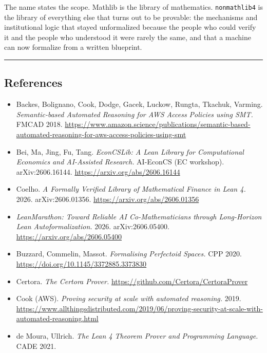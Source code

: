 \documentclass[
  11pt,
]{article}
\providecommand{\tightlist}{%
  \setlength{\itemsep}{0pt}\setlength{\parskip}{0pt}}
\renewcommand{\_}{\origunderscore\allowbreak}
\begin{document}
The name states the scope. Mathlib is the library of mathematics.
\texttt{nonmathlib4} is the library of everything else that turns out to
be provable: the mechanisms and institutional logic that stayed
unformalized because the people who could verify it and the people who
understood it were rarely the same, and that a machine can now formalize
from a written blueprint.

\begin{center}\rule{0.5\linewidth}{0.5pt}\end{center}

\subsection{References}\label{references}

\begin{itemize}
\tightlist
\item
  Backes, Bolignano, Cook, Dodge, Gacek, Luckow, Rungta, Tkachuk,
  Varming. \emph{Semantic-based Automated Reasoning for AWS Access
  Policies using SMT.} FMCAD 2018.
  \url{https://www.amazon.science/publications/semantic-based-automated-reasoning-for-aws-access-policies-using-smt}
\item
  Bei, Ma, Jing, Fu, Tang. \emph{EconCSLib: A Lean Library for
  Computational Economics and AI-Assisted Research.} AI-EconCS
   (EC workshop). arXiv:2606.16144.
  \url{https://arxiv.org/abs/2606.16144}
\item
  Coelho. \emph{A Formally Verified Library of Mathematical Finance in
  Lean 4.} 2026. arXiv:2606.01356.
  \url{https://arxiv.org/abs/2606.01356}
\item
  \emph{LeanMarathon: Toward Reliable AI Co-Mathematicians through
  Long-Horizon Lean Autoformalization.} 2026. arXiv:2606.05400.
  \url{https://arxiv.org/abs/2606.05400}
\item
  Buzzard, Commelin, Massot. \emph{Formalising Perfectoid Spaces.} CPP
  2020. \url{https://doi.org/10.1145/3372885.3373830}
\item
  Certora. \emph{The Certora Prover.}
  \url{https://github.com/Certora/CertoraProver}
\item
  Cook (AWS). \emph{Proving security at scale with automated reasoning.}
  2019.
  \url{https://www.allthingsdistributed.com/2019/06/proving-security-at-scale-with-automated-reasoning.html}
\item
  de Moura, Ullrich. \emph{The Lean 4 Theorem Prover and Programming
  Language.} CADE 2021.

\end{itemize}
\end{document}
